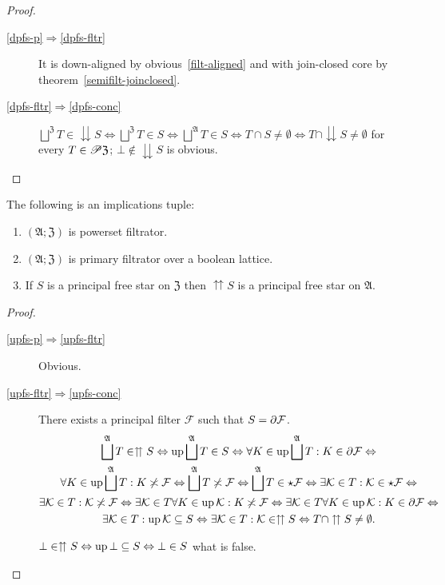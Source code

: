 \begin{proof}
~
\begin{description}
\item [{\ref{dpfs-p}$\Rightarrow$\ref{dpfs-fltr}}] It is down-aligned
by obvious~\ref{filt-aligned} and with join-closed core by theorem~\ref{semifilt-joinclosed}.
\item [{\ref{dpfs-fltr}$\Rightarrow$\ref{dpfs-conc}}] $\bigsqcup^{\mathfrak{Z}}T\in\downdownarrows S\Leftrightarrow\bigsqcup^{\mathfrak{Z}}T\in S\Leftrightarrow\bigsqcup^{\mathfrak{A}}T\in S\Leftrightarrow T\cap S\neq\emptyset\Leftrightarrow T\cap\downdownarrows S\neq\emptyset$
for every $T\in\mathscr{P}\mathfrak{Z}$; $\bot\notin\downdownarrows S$
is obvious.
\end{description}
\end{proof}
\begin{prop}
The following is an implications tuple:
\begin{enumerate}
\item \label{upfs-p}$(\mathfrak{A};\mathfrak{Z})$ is powerset filtrator.
\item \label{upfs-fltr}$(\mathfrak{A};\mathfrak{Z})$ is primary filtrator
over a boolean lattice.
\item \label{upfs-conc}If $S$ is a principal free star on $\mathfrak{Z}$
then $\upuparrows S$ is a principal free star on $\mathfrak{A}$.
\end{enumerate}
\end{prop}
\begin{proof}
~
\begin{description}
\item [{\ref{upfs-p}$\Rightarrow$\ref{upfs-fltr}}] Obvious.
\item [{\ref{upfs-fltr}$\Rightarrow$\ref{upfs-conc}}] There exists a
principal filter $\mathcal{F}$ such that $S=\partial\mathcal{F}$.
\begin{multline*}
\bigsqcup^{\mathfrak{A}}T\in\upuparrows S\Leftrightarrow\operatorname{up}\bigsqcup^{\mathfrak{A}}T\in S\Leftrightarrow\forall K\in\operatorname{up}\bigsqcup^{\mathfrak{A}}T:K\in\partial\mathcal{F}\Leftrightarrow\\
\forall K\in\operatorname{up}\bigsqcup^{\mathfrak{A}}T:K\not\asymp\mathcal{F}\Leftrightarrow\bigsqcup^{\mathfrak{A}}T\not\asymp\mathcal{F}\Leftrightarrow\bigsqcup^{\mathfrak{A}}T\in\star\mathcal{F}\Leftrightarrow\exists\mathcal{K}\in T:\mathcal{K}\in\star\mathcal{F}\Leftrightarrow\\
\exists\mathcal{K}\in T:\mathcal{K}\not\asymp\mathcal{F}\Leftrightarrow\exists\mathcal{K}\in T\forall K\in\operatorname{up}\mathcal{K}:K\not\asymp\mathcal{F}\Leftrightarrow\exists\mathcal{K}\in T\forall K\in\operatorname{up}\mathcal{K}:K\in\partial\mathcal{F}\Leftrightarrow\\
\exists\mathcal{K}\in T:\operatorname{up}\mathcal{K}\subseteq S\Leftrightarrow\exists\mathcal{K}\in T:\mathcal{K}\in\upuparrows S\Leftrightarrow T\cap\upuparrows S\neq\emptyset.
\end{multline*}



$\bot\in\upuparrows S\Leftrightarrow\operatorname{up}\bot\subseteq S\Leftrightarrow\bot\in S$
what is false.

\end{description}
\end{proof}

